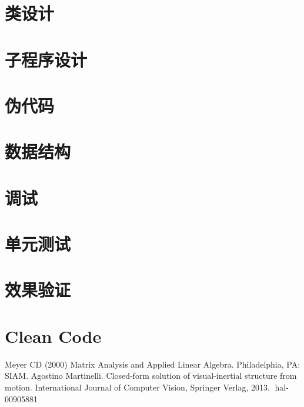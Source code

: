 \documentclass{article}
\begin{document}
\section{类设计}

\section{子程序设计}

\section{伪代码}

\section{数据结构}

\section{调试}

\section{单元测试}

\section{效果验证}

\section{Clean Code}



\begin{thebibliography}{99}  
    Meyer CD (2000) Matrix Analysis and Applied Linear Algebra. Philadelphia, PA: SIAM.
     Agostino Martinelli. Closed-form solution of visual-inertial structure from motion. International
    Journal of Computer Vision, Springer Verlag, 2013. ￿hal-00905881
\end{thebibliography}
\end{document}
